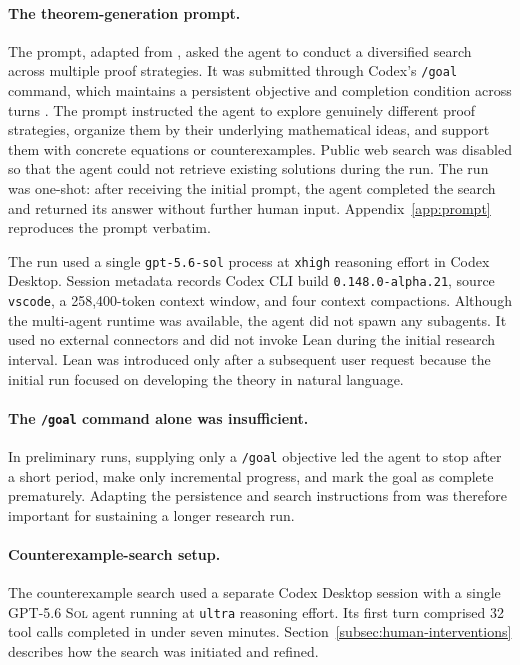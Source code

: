 \documentclass{article}
\theoremstyle{definition}
\theoremstyle{plain}
\newcommand{\gpt}{\textsc{GPT-5.6 Sol}\xspace}
\begin{document}
\paragraph{The theorem-generation prompt.}
The prompt, adapted from \citet{openai2026cdcprompt}, asked the agent to conduct a diversified search across multiple proof strategies. It was submitted through Codex's \texttt{/goal} command, which maintains a persistent objective and completion condition across turns \citep{pathak2026goals}. The prompt instructed the agent to explore genuinely different proof strategies, organize them by their underlying mathematical ideas, and support them with concrete equations or counterexamples. Public web search was disabled so that the agent could not retrieve existing solutions during the run. The run was one-shot: after receiving the initial prompt, the agent completed the search and returned its answer without further human input. Appendix~\ref{app:prompt} reproduces the prompt verbatim.

The run used a single \texttt{gpt-5.6-sol} process at \texttt{xhigh} reasoning effort in Codex Desktop. Session metadata records Codex CLI build \texttt{0.148.0-alpha.21}, source \texttt{vscode}, a 258,400-token context window, and four context compactions. Although the multi-agent runtime was available, the agent did not spawn any subagents. It used no external connectors and did not invoke Lean during the initial research interval. Lean was introduced only after a subsequent user request because the initial run focused on developing the theory in natural language.

\paragraph{The \texttt{/goal} command alone was insufficient.}
In preliminary runs, supplying only a \texttt{/goal} objective led the agent to stop after a short period, make only incremental progress, and mark the goal as complete prematurely. Adapting the persistence and search instructions from \citet{openai2026cdcprompt} was therefore important for sustaining a longer research run.

\paragraph{Counterexample-search setup.}
The counterexample search used a separate Codex Desktop session with a single \gpt agent running at \texttt{ultra} reasoning effort. Its first turn comprised 32 tool calls completed in under seven minutes. Section~\ref{subsec:human-interventions} describes how the search was initiated and refined.
\end{document}
